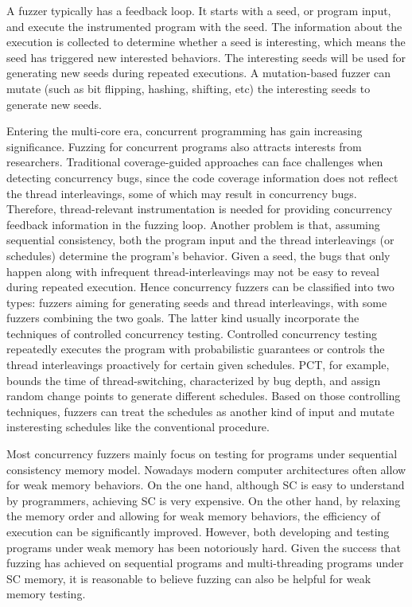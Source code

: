 A fuzzer typically has a feedback loop. It starts with a seed, or program input, and execute the instrumented program with the seed. The information about the execution is collected to determine whether a seed is interesting, which means the seed has triggered new interested behaviors. The interesting seeds will be used for generating new seeds during repeated executions. A mutation-based fuzzer can mutate (such as bit flipping, hashing, shifting, etc) the interesting seeds to generate new seeds. 



Entering the multi-core era, concurrent programming has gain increasing significance. Fuzzing for concurrent programs also attracts interests from researchers. Traditional coverage-guided approaches can face challenges when detecting concurrency bugs, since the code coverage information does not reflect the thread interleavings, some of which may result in concurrency bugs. Therefore, thread-relevant instrumentation is needed for providing concurrency feedback information in the fuzzing loop. Another problem is that, assuming sequential consistency, both the program input and the thread interleavings (or schedules) determine the program's behavior. Given a seed, the bugs that only happen along with infrequent thread-interleavings may not be easy to reveal during repeated execution. Hence concurrency fuzzers can be classified into two types: fuzzers aiming for generating seeds\cite{muzz} and thread interleavings\cite{rff, conzzer}, with some fuzzers combining the two goals. The latter kind usually incorporate the techniques of controlled concurrency testing. Controlled concurrency testing repeatedly executes the program with probabilistic guarantees or controls the thread interleavings proactively for certain given schedules. PCT\cite{pct}, for example, bounds the time of thread-switching, characterized by bug depth, and assign random change points to generate different schedules. Based on those controlling techniques, fuzzers can treat the schedules as another kind of input and mutate insteresting schedules like the conventional procedure. 



Most concurrency fuzzers mainly focus on testing for programs under sequential consistency memory model. Nowadays modern computer architectures often allow for weak memory behaviors. On the one hand, although SC is easy to understand by programmers, achieving SC is very expensive. On the other hand, by relaxing the memory order and allowing for weak memory behaviors, the efficiency of execution can be significantly improved. However, both developing and testing programs under weak memory has been notoriously hard. Given the success that fuzzing has achieved on sequential programs and multi-threading programs under SC memory, it is reasonable to believe fuzzing can also be helpful for weak memory testing. 





